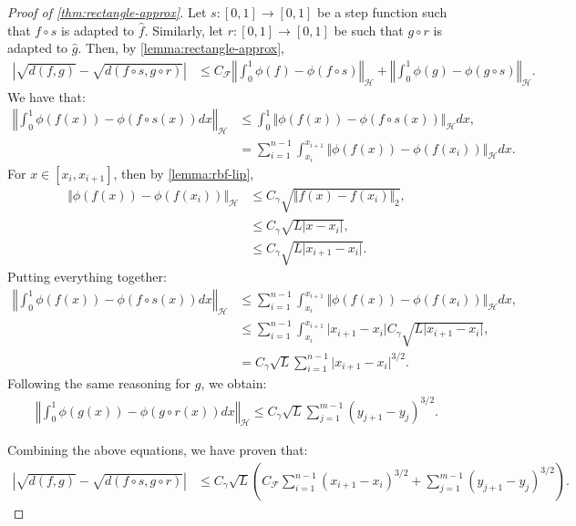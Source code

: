 \begin{proof}[Proof of \cref{thm:rectangle-approx}]
Let $s:[0,1] \to [0,1]$ be a step function such that $f\circ s$ is adapted to $\hat f$. Similarly, let $r:[0,1]\to[0,1]$ be such that $g\circ r$ is adapted to $\hat g$. Then, by \cref{lemma:rectangle-approx},
\begin{align}
    \left\vert \sqrt{d(f, g)} - \sqrt{d(f \circ s, g\circ r)} \right\vert &\leq C_\mathcal F\left\Vert \int_0^1 \phi(f) - \phi(f\circ s)\right\Vert_{\mathcal H} + \left\Vert \int_0^1 \phi(g)- \phi(g\circ s)\right\Vert_\mathcal H.
\end{align}
We have that:
\begin{align}
\left\Vert \int_0^1\phi(f(x)) - \phi(f\circ s(x))dx\right\Vert_{\mathcal H} &\leq \int_0^1\Vert\phi(f(x)) - \phi(f\circ s(x))\Vert_\mathcal H dx,\\
&= \sum_{i=1}^{n-1} \int_{x_i}^{x_{i+1}}\Vert\phi(f(x)) - \phi(f(x_i))\Vert_\mathcal H dx.
\end{align}
For $x \in [x_i, x_{i+1}]$, then by \cref{lemma:rbf-lip},
\begin{align}
\Vert \phi(f(x)) - \phi(f(x_i))\Vert_\mathcal H&\leq C_\gamma \sqrt{\Vert f(x) - f(x_i)\Vert_2},\\
& \leq C_\gamma \sqrt{L\vert x - x_i\vert},\\
& \leq C_\gamma \sqrt{L\vert x_{i+1} - x_i \vert}.
\end{align}
Putting everything together:
\begin{align}
\left\Vert \int_0^1\phi(f(x)) - \phi(f\circ s(x))dx\right\Vert_{\mathcal H} &\leq \sum_{i=1}^{n-1} \int_{x_i}^{x_{i+1}}\Vert\phi(f(x)) - \phi(f(x_i))\Vert_\mathcal H dx,\\
&\leq \sum_{i=1}^{n-1} \int_{x_i}^{x_{i+1}}\vert x_{i+1} - x_i\vert C_\gamma \sqrt{L\vert x_{i+1} - x_i\vert},\\
&= C_\gamma \sqrt{L}\sum_{i=1}^{n-1} \vert x_{i+1} - x_i\vert^{3/2}.
\end{align}
Following the same reasoning for $g$, we obtain:
\begin{align}
\left\Vert \int_0^1\phi(g(x)) - \phi(g\circ r(x))dx\right\Vert_{\mathcal H}  \leq C_\gamma \sqrt{L}\sum_{j=1}^{m-1} (y_{j+1} - y_{j})^{3/2}.
\end{align}

Combining the above equations, we have proven that:
\begin{align}
    \left\vert \sqrt{d(f, g)} - \sqrt{d(f \circ s, g\circ r)} \right\vert &\leq C_\gamma \sqrt{L}\left(C_\mathcal F \sum_{i=1}^{n-1} (x_{i+1} - x_i)^{3/2} + \sum_{j=1}^{m-1}(y_{j+1} - y_j)^{3/2}\right).
\end{align}

\end{proof}

